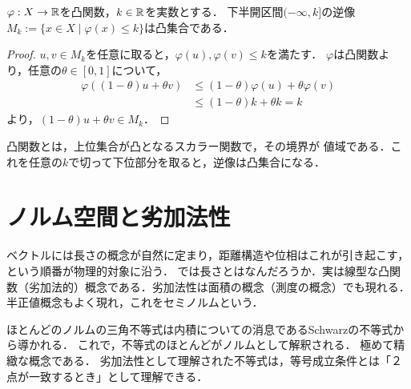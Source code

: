\documentclass[uplatex, dvipdfmx]{jsreport}
\begin{document}
\begin{proposition}
    $\varphi:X\to\mathbb{R}$を凸関数，$k\in\mathbb{R}$を実数とする．
    下半開区間$(-\infty,k]$の逆像$M_k:=\{x\in X\mid \varphi(x)\le k\}$は凸集合である．
\end{proposition}
\begin{proof}
    $u,v\in M_k$を任意に取ると，$\varphi(u),\varphi(v)\le k$を満たす．
    $\varphi$は凸関数より，任意の$\theta\in[0,1]$について，
    \begin{align*}
        \varphi((1-\theta)u+\theta v)&\le (1-\theta)\varphi(u)+\theta\varphi(v)\\
        &\le(1-\theta)k+\theta k=k
    \end{align*}
    より，$(1-\theta)u+\theta v\in M_k$．
\end{proof}
\begin{remarks}
    凸関数とは，上位集合が凸となるスカラー関数で，その境界が
    値域である．これを任意の$k$で切って下位部分を取ると，逆像は凸集合になる．
\end{remarks}

\section{ノルム空間と劣加法性}

\begin{tcolorbox}[colframe=ForestGreen, colback=ForestGreen!10!white,breakable,colbacktitle=ForestGreen!40!white,coltitle=black,fonttitle=\bfseries\sffamily,
title=ほとんどの不等式は劣加法性として理解できる]
    ベクトルには長さの概念が自然に定まり，距離構造や位相はこれが引き起こす，という順番が物理的対象に沿う．
    では長さとはなんだろうか．実は線型な凸関数（劣加法的）概念である．劣加法性は面積の概念（測度の概念）でも現れる．
    半正値概念もよく現れ，これをセミノルムという．

    ほとんどのノルムの三角不等式は内積についての消息であるSchwarzの不等式から導かれる．
    これで，不等式のほとんどがノルムとして解釈される．
    極めて精緻な概念である．
    劣加法性として理解された不等式は，等号成立条件とは「２点が一致するとき」として理解できる．
\end{tcolorbox}
\end{document}

